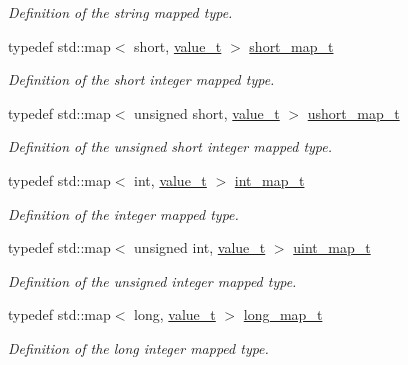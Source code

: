 \begin{DoxyCompactItemize}
\begin{DoxyCompactList}\small\item\em Definition of the string mapped type. \end{DoxyCompactList}\item 
typedef std\+::map$<$ short, \hyperlink{struct_d_d4hep_1_1_primitive_a0639e73bb8f07f99c2d8401f807a7af6}{value\+\_\+t} $>$ \hyperlink{struct_d_d4hep_1_1_primitive_ad899cb08d4a2d808891f5297600653ae}{short\+\_\+map\+\_\+t}
\begin{DoxyCompactList}\small\item\em Definition of the short integer mapped type. \end{DoxyCompactList}\item 
typedef std\+::map$<$ unsigned short, \hyperlink{struct_d_d4hep_1_1_primitive_a0639e73bb8f07f99c2d8401f807a7af6}{value\+\_\+t} $>$ \hyperlink{struct_d_d4hep_1_1_primitive_a05bca6a7dcdad2a935793e45d9746079}{ushort\+\_\+map\+\_\+t}
\begin{DoxyCompactList}\small\item\em Definition of the unsigned short integer mapped type. \end{DoxyCompactList}\item 
typedef std\+::map$<$ int, \hyperlink{struct_d_d4hep_1_1_primitive_a0639e73bb8f07f99c2d8401f807a7af6}{value\+\_\+t} $>$ \hyperlink{struct_d_d4hep_1_1_primitive_acfd7524785eae3d3470f44b23ce0424f}{int\+\_\+map\+\_\+t}
\begin{DoxyCompactList}\small\item\em Definition of the integer mapped type. \end{DoxyCompactList}\item 
typedef std\+::map$<$ unsigned int, \hyperlink{struct_d_d4hep_1_1_primitive_a0639e73bb8f07f99c2d8401f807a7af6}{value\+\_\+t} $>$ \hyperlink{struct_d_d4hep_1_1_primitive_a6c4a254056e6d4de6c023c0f099ad40f}{uint\+\_\+map\+\_\+t}
\begin{DoxyCompactList}\small\item\em Definition of the unsigned integer mapped type. \end{DoxyCompactList}\item 
typedef std\+::map$<$ long, \hyperlink{struct_d_d4hep_1_1_primitive_a0639e73bb8f07f99c2d8401f807a7af6}{value\+\_\+t} $>$ \hyperlink{struct_d_d4hep_1_1_primitive_ad93415660e6d4d711daa9d9135c6e2b5}{long\+\_\+map\+\_\+t}
\begin{DoxyCompactList}\small\item\em Definition of the long integer mapped type. \end{DoxyCompactList}\item 

\end{DoxyCompactItemize}
